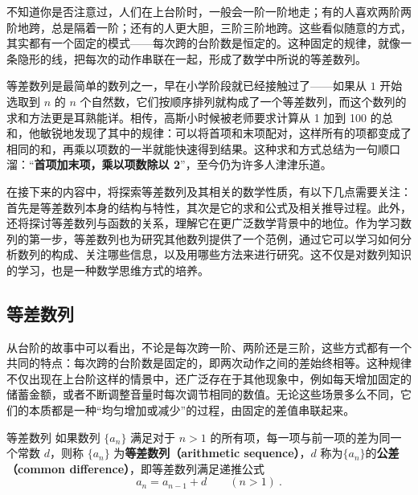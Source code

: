 
\begin{issues}
\issueDraft
\end{issues}


不知道你是否注意过，人们在上台阶时，一般会一阶一阶地走；有的人喜欢两阶两阶地跨，总是隔着一阶；还有的人更大胆，三阶三阶地跨。这些看似随意的方式，其实都有一个固定的模式——每次跨的台阶数是恒定的。这种固定的规律，就像一条隐形的线，把每次的动作串联在一起，形成了数学中所说的等差数列。

等差数列是最简单的数列之一，早在小学阶段就已经接触过了——如果从 $1$ 开始选取到  $n$  的  $n$  个自然数，它们按顺序排列就构成了一个等差数列，而这个数列的求和方法更是耳熟能详。相传，高斯小时候被老师要求计算从 1 加到 100 的总和，他敏锐地发现了其中的规律：可以将首项和末项配对，这样所有的项都变成了相同的和，再乘以项数的一半就能快速得到结果。这种求和方式总结为一句顺口溜：“\textbf{首项加末项，乘以项数除以 2}”，至今仍为许多人津津乐道。

在接下来的内容中，将探索等差数列及其相关的数学性质，有以下几点需要关注：首先是等差数列本身的结构与特性，其次是它的求和公式及相关推导过程。此外，还将探讨等差数列与函数的关系，理解它在更广泛数学背景中的地位。作为学习数列的第一步，等差数列也为研究其他数列提供了一个范例，通过它可以学习如何分析数列的构成、关注哪些信息，以及用哪些方法来进行研究。这不仅是对数列知识的学习，也是一种数学思维方式的培养。

\subsection{等差数列}\label{sub_HsAmPg_1}

从台阶的故事中可以看出，不论是每次跨一阶、两阶还是三阶，这些方式都有一个共同的特点：每次跨的台阶数是固定的，即两次动作之间的差始终相等。这种规律不仅出现在上台阶这样的情景中，还广泛存在于其他现象中，例如每天增加固定的储蓄金额，或者不断调整音量时每次调节相同的数值。无论这些场景多么不同，它们的本质都是一种“均匀增加或减少”的过程，由固定的差值串联起来。

\begin{definition}{等差数列}\label{def_HsAmPg_1}
如果数列 $\{a_n\}$ 满足对于 $n > 1$ 的所有项，每一项与前一项的差为同一个常数 $d$，则称 $\{a_n\}$ 为\textbf{等差数列（arithmetic sequence）}，$d$ 称为$\{a_n\}$的\textbf{公差（common difference）}，即等差数列满足递推公式
\begin{equation}
a_{n}=a_{n-1}+d\qquad(n>1)~.
\end{equation}
\end{definition}

